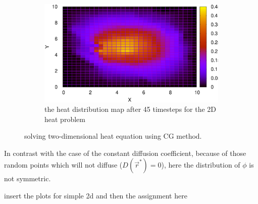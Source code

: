 \begin{figure}
\begin{subfigure}[b]{0.45\textwidth}
     \end{subfigure}
     \hfill     
          \begin{subfigure}[b]{0.45\textwidth}
         \centering
         \includegraphics[width=\textwidth]{2DRandomDfig/45_map}
		\caption{the heat distribution map after 45 timesteps for the 2D heat problem}
		\label{fig:2d-randomD-45dt-map}
     \end{subfigure}
     \hfill     
        \caption{solving two-dimensional heat equation using CG method.}
        \label{fig:2d-CG-randomD}
\end{figure}

In contrast with the case of the constant diffusion coefficient, because of those random points which will not diffuse ($D(\vec{r}^{*})=0$), here the distribution of $\phi$ is not symmetric.

insert the plots for simple 2d and then the assignment here
